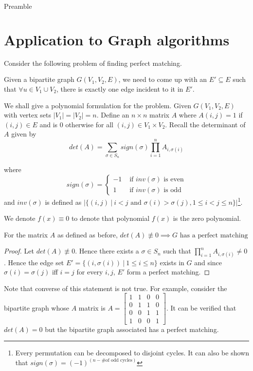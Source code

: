 \noindent
Preamble

\section{Application to Graph algorithms}
Consider the following problem of finding perfect matching.
\begin{definition}
Given a bipartite graph $G(V_1,V_2, E)$, we need to come up with an $E'
\subseteq E$ such that $\forall u \in V_1 \cup V_2$, there is exactly one edge
incident to it in $E'$.
\end{definition}

We shall give a polynomial formulation for the problem. Given $G(V_1, V_2, E)$
with vertex sets $|V_1| = |V_2| = n$. Define an $n\times n$ matrix $A$ where
$A(i,j) = 1$ if $(i,j) \in E$ and is $0$ otherwise for all $(i,j) \in V_1 \times
V_2$. Recall the determinant of $A$ given
by
\[ det(A) = \sum_{\sigma \in S_n} sign(\sigma) \prod_{i=1}^n A_{i,\sigma(i)}
\]

where \[
sign(\sigma) = \begin{cases} 
	  -1  & \text{ if } inv(\sigma) \text{ is even} \\
	  1 & \text{ if } inv(\sigma) \text{ is odd}
\end{cases}\]
and $inv(\sigma)$ is defined as 
$\left |\{(i,j) ~|~ i < j \text{ and } \sigma(i) > \sigma(j), 1 \le i<j \le n\}
\right |$\footnote{Every permutation can be decomposed to disjoint cycles. It
can also be shown that $sign(\sigma) = (-1)^{(n - \text{\# of odd cycles})}$}.

We denote $f(x) \equiv 0$ to denote that polynomial $f(x)$ is the zero
polynomial.
\begin{lemma}
For the matrix $A$ as defined as before, $det(A) \not \equiv 0 \implies
\text{$G$ has a perfect matching}$ \label{lem:det_pm_simple}
\end{lemma}
\begin{proof}
Let $det(A) \not \equiv 0$. Hence there exists a $\sigma \in
S_n$ such that $\prod_{i=1}^n A_{i, \sigma(i)} \ne 0$. Hence the edge set
$E' = \{(i, \sigma(i)) ~|~ 1\le i\le n\}$ exists in $G$ and since $\sigma(i) =
\sigma(j)$ iff $i=j$ for every $i,j$, $E'$ form a perfect matching.

\end{proof}
Note that converse of this statement is not true. For example, consider the
bipartite graph whose $A$ matrix is $A = 
\begin{bmatrix}
		1 & 1 & 0 & 0 \\
		0 & 1 & 1 & 0 \\
		0 & 0 & 1 & 1 \\
	        1 & 0 & 0 & 1
\end{bmatrix}
$. It can be verified that $det(A) = 0$ but the bipartite graph associated has
a perfect matching.

